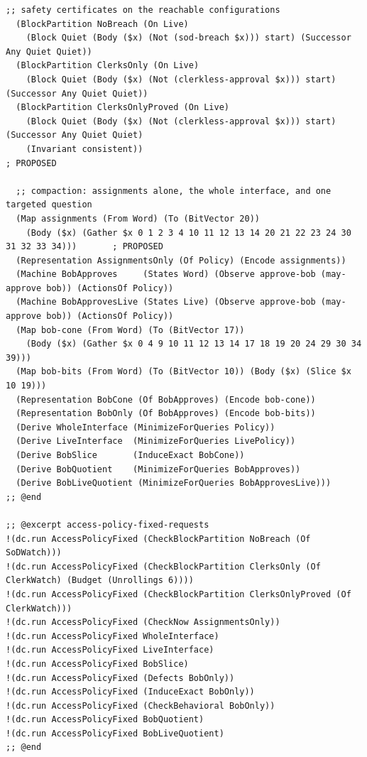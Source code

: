 \documentclass[11pt]{article}
\theoremstyle{definition}
\theoremstyle{plain}
\begin{document}
\begin{lstlisting}[style=mettafull]
  ;; safety certificates on the reachable configurations
  (BlockPartition NoBreach (On Live)
    (Block Quiet (Body ($x) (Not (sod-breach $x))) start) (Successor Any Quiet Quiet))
  (BlockPartition ClerksOnly (On Live)
    (Block Quiet (Body ($x) (Not (clerkless-approval $x))) start) (Successor Any Quiet Quiet))
  (BlockPartition ClerksOnlyProved (On Live)
    (Block Quiet (Body ($x) (Not (clerkless-approval $x))) start) (Successor Any Quiet Quiet)
    (Invariant consistent))                                                                 ; PROPOSED

  ;; compaction: assignments alone, the whole interface, and one targeted question
  (Map assignments (From Word) (To (BitVector 20))
    (Body ($x) (Gather $x 0 1 2 3 4 10 11 12 13 14 20 21 22 23 24 30 31 32 33 34)))       ; PROPOSED
  (Representation AssignmentsOnly (Of Policy) (Encode assignments))
  (Machine BobApproves     (States Word) (Observe approve-bob (may-approve bob)) (ActionsOf Policy))
  (Machine BobApprovesLive (States Live) (Observe approve-bob (may-approve bob)) (ActionsOf Policy))
  (Map bob-cone (From Word) (To (BitVector 17))
    (Body ($x) (Gather $x 0 4 9 10 11 12 13 14 17 18 19 20 24 29 30 34 39)))
  (Map bob-bits (From Word) (To (BitVector 10)) (Body ($x) (Slice $x 10 19)))
  (Representation BobCone (Of BobApproves) (Encode bob-cone))
  (Representation BobOnly (Of BobApproves) (Encode bob-bits))
  (Derive WholeInterface (MinimizeForQueries Policy))
  (Derive LiveInterface  (MinimizeForQueries LivePolicy))
  (Derive BobSlice       (InduceExact BobCone))
  (Derive BobQuotient    (MinimizeForQueries BobApproves))
  (Derive BobLiveQuotient (MinimizeForQueries BobApprovesLive)))
;; @end

;; @excerpt access-policy-fixed-requests
!(dc.run AccessPolicyFixed (CheckBlockPartition NoBreach (Of SoDWatch)))
!(dc.run AccessPolicyFixed (CheckBlockPartition ClerksOnly (Of ClerkWatch) (Budget (Unrollings 6))))
!(dc.run AccessPolicyFixed (CheckBlockPartition ClerksOnlyProved (Of ClerkWatch)))
!(dc.run AccessPolicyFixed (CheckNow AssignmentsOnly))
!(dc.run AccessPolicyFixed WholeInterface)
!(dc.run AccessPolicyFixed LiveInterface)
!(dc.run AccessPolicyFixed BobSlice)
!(dc.run AccessPolicyFixed (Defects BobOnly))
!(dc.run AccessPolicyFixed (InduceExact BobOnly))
!(dc.run AccessPolicyFixed (CheckBehavioral BobOnly))
!(dc.run AccessPolicyFixed BobQuotient)
!(dc.run AccessPolicyFixed BobLiveQuotient)
;; @end
\end{lstlisting}
\end{document}
